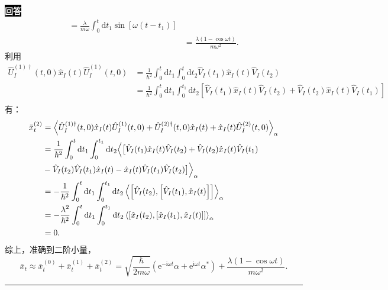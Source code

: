 \documentclass[11pt,a4paper]{ctexart}
\newenvironment{answer}
  {\par\smallskip\noindent
   \begingroup
   \setlength{\fboxsep}{4pt}%
   \colorbox{black}{\textcolor{white}{\bfseries 回答}}%
   \endgroup
   \quad\ignorespaces}
  {\par\smallskip\noindent\rule{\linewidth}{0.4pt}\medskip}
\begin{document}
\begin{answer}
\begin{equation}
\begin{aligned}
      =\frac{\lambda }{m\omega } \int_{0}^{t}\mathrm{d}t_1 \sin\left[\omega\left(t-t_1 \right) \right] \\
      &=\frac{\lambda\left(1-\cos \omega t \right) }{m\omega^2 }.
    \end{aligned}
  \end{equation}
  利用
  \begin{equation}
    \begin{aligned}
      \hat{U}_I^{(1)\dag}(t,0) \hat{x}_I(t) \hat{U}_I^{(1)}(t,0)
      &=\frac{1 }{\hbar^2 } \int_{0}^{t}\mathrm{d}t_1\int_{0}^{t}\mathrm{d}t_2 \hat{V}_I(t_1)\hat{x}_I(t)\hat{V}_I(t_2) \\
      &=\frac{1 }{\hbar^2 } \int_{0}^{t}\mathrm{d}t_1\int_{0}^{t_1}\mathrm{d}t_2 \left[\hat{V}_I(t_1)\hat{x}_I(t)\hat{V}_I(t_2) + \hat{V}_I(t_2)\hat{x}_I(t)\hat{V}_I(t_1) \right] \\
    \end{aligned}
  \end{equation}
  有：
  \begin{equation}
    \begin{aligned}
      \bar{x}_t^{(2)}
      &=\Braket{\hat{U}_I^{(1)\dag}(t,0)\hat{x}_I(t)\hat{U}_I^{(1)}(t,0) + \hat{U}_I^{(2)\dag}(t,0) \hat{x}_I(t) + \hat{x}_I(t)\hat{U}_I^{(2)}(t,0)  }_\alpha \\
      &=\frac{1 }{\hbar^2 } \int_{0}^{t}\mathrm{d}t_1\int_{0}^{t_1}\mathrm{d}t_2 \Big\langle\big[\hat{V}_I(t_1)\hat{x}_I(t)\hat{V}_I(t_2) + \hat{V}_I(t_2)\hat{x}_I(t)\hat{V}_I(t_1) \\
      &-\hat{V}_I(t_2)\hat{V}_I(t_1)\hat{x}_I(t) - \hat{x}_I(t)\hat{V}_I(t_1)\hat{V}_I(t_2) \big]\Big\rangle_\alpha \\
      &=-\frac{1 }{\hbar^2 } \int_{0}^{t}\mathrm{d}t_1\int_{0}^{t_1}\mathrm{d}t_2 \Braket{\left[\hat{V}_I(t_2),\left[\hat{V}_I(t_1),\hat{x}_I(t) \right] \right] }_\alpha \\
      &=-\frac{\lambda^2 }{\hbar^2 } \int_{0}^{t}\mathrm{d}t_1\int_{0}^{t_1}\mathrm{d}t_2 \Braket{\left[\hat{x}_I(t_2),\left[\hat{x}_I(t_1),\hat{x}_I(t) \right] \right] }_\alpha \\
      &=0.
    \end{aligned}
  \end{equation}
  综上，准确到二阶小量，
  \begin{equation}
    \bar{x}_t
    \approx \bar{x}_t^{(0)} + \bar{x}_t^{(1)} + \bar{x}_t^{(2)}
    =\sqrt{\frac{\hbar }{2m\omega } } \left(\mathrm{e}^{-\mathrm{i}\omega t}\alpha + \mathrm{e}^{\mathrm{i}\omega t}\alpha^* \right) + \frac{\lambda\left(1-\cos \omega t \right) }{m\omega^2 }.
  \end{equation}
\end{answer}
\end{document}
